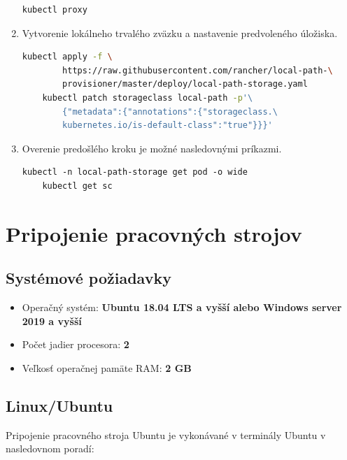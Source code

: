 \begin{enumerate}
{\begin{lstlisting}[language=Bash,basicstyle=\footnotesize]
    kubectl proxy
\end{lstlisting}}
\item{\noindent Vytvorenie lokálneho trvalého zväzku a nastavenie predvoleného úložiska.
\begin{lstlisting}[language=Bash,basicstyle=\footnotesize]
    kubectl apply -f \
        https://raw.githubusercontent.com/rancher/local-path-\
        provisioner/master/deploy/local-path-storage.yaml
    kubectl patch storageclass local-path -p'\
        {"metadata":{"annotations":{"storageclass.\
        kubernetes.io/is-default-class":"true"}}}'
\end{lstlisting}}
\item{\noindent Overenie predošlého kroku je možné nasledovnými príkazmi.
\begin{lstlisting}[basicstyle=\footnotesize]
    kubectl -n local-path-storage get pod -o wide
    kubectl get sc
\end{lstlisting}}
\end{enumerate}

\section{Pripojenie pracovných strojov}

\subsection*{Systémové požiadavky}

\begin{itemize}
    \item Operačný systém: \textbf{Ubuntu 18.04 LTS a vyšší alebo Windows server 2019 a vyšší}
	\item Počet jadier procesora: \textbf{2}
    \item Veľkosť operačnej pamäte RAM: \textbf{2 GB}
\end{itemize}

\subsection*{Linux/Ubuntu}

Pripojenie pracovného stroja Ubuntu je vykonávané v terminály Ubuntu v nasledovnom poradí:

